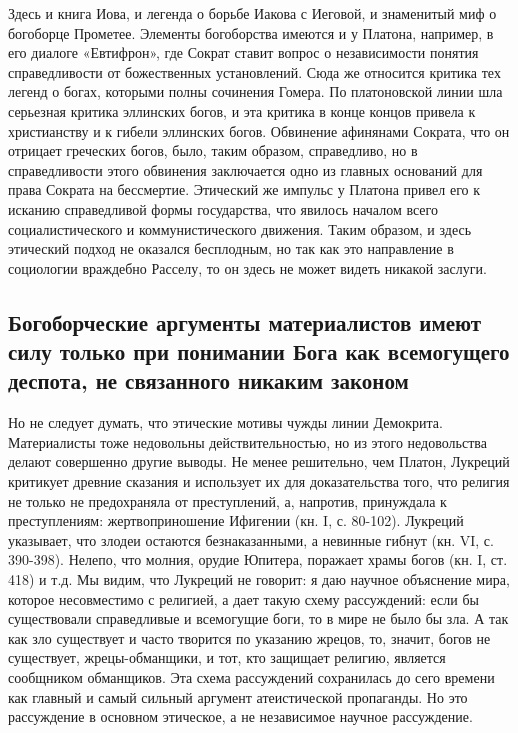 Здесь и книга Иова, и легенда о борьбе Иакова с Иеговой, и знаменитый
миф о богоборце Прометее. Элементы богоборства имеются и у Платона,
например, в его диалоге «Евтифрон», где Сократ ставит вопрос о
независимости понятия справедливости от божественных установлений.
Сюда же относится критика тех легенд о богах, которыми полны сочинения
Гомера. По платоновской линии шла серьезная критика эллинских богов, и
эта критика в конце концов привела к христианству и к гибели эллинских
богов. Обвинение афинянами Сократа, что он отрицает греческих богов,
было, таким образом, справедливо, но в справедливости этого обвинения
заключается одно из главных оснований для права Сократа на бессмертие.
Этический же импульс у Платона привел его к исканию справедливой формы
государства, что явилось началом всего социалистического и
коммунистического движения. Таким образом, и здесь этический подход не
оказался бесплодным, но так как это направление в социологии враждебно
Расселу, то он здесь не может видеть никакой заслуги.

\subsection{Богоборческие аргументы материалистов имеют силу только
при понимании Бога как всемогущего деспота, не связанного никаким
законом}

Но не следует думать, что этические мотивы чужды линии Демокрита.
Материалисты тоже недовольны действительностью, но из этого
недовольства делают совершенно другие выводы. Не менее решительно, чем
Платон, Лукреций критикует древние сказания и использует их для
доказательства того, что религия не только не предохраняла от
преступлений, а, напротив, принуждала к преступлениям:
жертвоприношение Ифигении (кн. I, с. 80-102). Лукреций указывает, что
злодеи остаются безнаказанными, а невинные гибнут (кн. VI, с.
390-398). Нелепо, что молния, орудие Юпитера, поражает храмы богов
(кн. I, ст. 418) и т.д. Мы видим, что Лукреций не говорит: я даю
научное объяснение мира, которое несовместимо с религией, а дает такую
схему рассуждений: если бы существовали справедливые и всемогущие
боги, то в мире не было бы зла. А так как зло существует и часто
творится по указанию жрецов, то, значит, богов не существует,
жрецы-обманщики, и тот, кто защищает религию, является сообщником
обманщиков. Эта схема рассуждений сохранилась до сего времени как
главный и самый сильный аргумент атеистической пропаганды. Но это
рассуждение в основном этическое, а не независимое научное
рассуждение.

